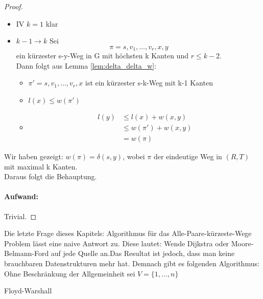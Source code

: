 \begin{proof}
\begin{itemize}[label=$\lozenge$, itemsep=2ex]
	\item IV \underline{$k=1$} klar
	\item \underline{$k-1 \to k$} Sei 
		\[
		\pi=s,v_1,\ldots,v_r,x,y
		\]
	ein kürzester s-y-Weg in G mit höchsten k Kanten und $r\le k-2$. \\
	Dann folgt aus Lemma \ref{lem:delta_delta_w}:
	\begin{itemize}
		\item $\pi'=s,v_1,\ldots,v_r,x$ ist ein kürzester s-k-Weg mit k-1 Kanten
		\item $l(x)\le w(\pi')$
		\item \begin{align*}
				l(y)&\le l(x)+w(x,y) \\
				    &\le w(\pi') + w(x,y) \\
				    &= w(\pi)
		\end{align*}
	\end{itemize}
\end{itemize}
Wir haben gezeigt: $w(\pi) = \delta(s,y)$, wobei $\pi$ der eindeutige Weg in $(R,T)$ mit maximal k Kanten. \\
Daraus folgt die Behauptung.
\paragraph{Aufwand:} Trivial.
\end{proof}
Die letzte Frage dieses Kapitels: Algorithmus für das Alle-Paare-kürzeste-Wege Problem lässt eine naive Antwort zu. Diese lautet: Wende Dijkstra oder Moore-Belmann-Ford auf jede Quelle an.Das Resultat ist jedoch, dass man keine brauchbaren Datenstrukturen mehr hat. Demnach gibt es folgenden Algorithmus:\\
Ohne Beschränkung der Allgemeinheit sei $V=\{1,\ldots,n\} $ \\
\begin{algorithm}[H]
	\label{alg:fw}
	\caption{Floyd-Warshall}
	\begin{itemize}
		\item \begin{{align*}
			$l_{i,j} = w(i,j) \qquad,(i,j) \in E$\\
			$l_{i,j} = \infty \qquad,\forall (i,j) \in (V\times V)\backslash E, i = j$\\
			$l_{i,i} = 0 \qquad, i \in V$\\
			$p_{i,j} = i \qquad, i,j \in V$
		\end{align*}
		\item \For{$j = 1,...,n$}{\For{$i = 1,...,n, i\neq j$}{\For{$k = 1,...,n, k \neq j$}{
			\If{$l_{i,k} > l_{i,j} + l_{j,k}$}
			{
				$l_{i,k} = l_{i,j} + l_{j,k}$
				$p_{i,k} = p_{j,k}$
			}
		}}}
	\end{itemize}
\end{algorithm}
